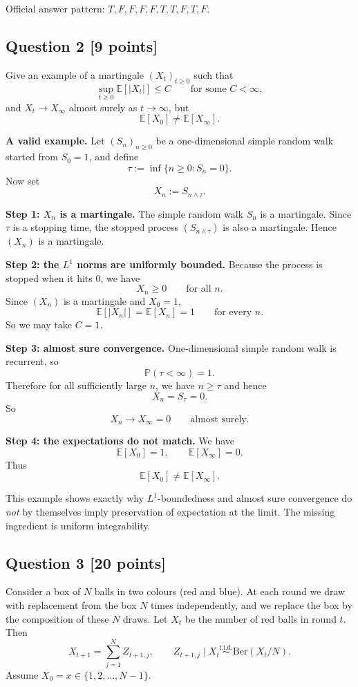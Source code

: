 \documentclass[11pt]{article}
\theoremstyle{definition}
\begin{document}
\begin{summarybox}
Official answer pattern: \(T,F,F,F,F,T,T,F,T,F\).
\end{summarybox}

\subsection*{Question 2 \hfill [9 points]}
Give an example of a martingale \((X_t)_{t\ge 0}\) such that
\[
\sup_{t\ge 0}\mathbb E[|X_t|]\le C
\qquad \text{for some } C<\infty,
\]
and \(X_t\to X_\infty\) almost surely as \(t\to\infty\), but
\[
\mathbb E[X_0]\neq \mathbb E[X_\infty].
\]

\textbf{A valid example.}
Let \((S_n)_{n\ge 0}\) be a one-dimensional simple random walk started from \(S_0=1\), and define
\[
\tau:=\inf\{n\ge 0:S_n=0\}.
\]
Now set
\[
X_n:=S_{n\wedge \tau}.
\]

\textbf{Step 1: \(X_n\) is a martingale.}
The simple random walk \(S_n\) is a martingale. Since \(\tau\) is a stopping time, the stopped process \((S_{n\wedge \tau})\) is also a martingale. Hence \((X_n)\) is a martingale.

\textbf{Step 2: the \(L^1\) norms are uniformly bounded.}
Because the process is stopped when it hits \(0\), we have
\[
X_n\ge 0
\qquad \text{for all } n.
\]
Since \((X_n)\) is a martingale and \(X_0=1\),
\[
\mathbb E[|X_n|]=\mathbb E[X_n]=1
\qquad \text{for every } n.
\]
So we may take \(C=1\).

\textbf{Step 3: almost sure convergence.}
One-dimensional simple random walk is recurrent, so
\[
\mathbb P(\tau<\infty)=1.
\]
Therefore for all sufficiently large \(n\), we have \(n\ge \tau\) and hence
\[
X_n=S_\tau=0.
\]
So
\[
X_n\to X_\infty=0
\qquad \text{almost surely.}
\]

\textbf{Step 4: the expectations do not match.}
We have
\[
\mathbb E[X_0]=1,
\qquad
\mathbb E[X_\infty]=0.
\]
Thus
\[
\mathbb E[X_0]\neq \mathbb E[X_\infty].
\]

\begin{summarybox}
This example shows exactly why \(L^1\)-boundedness and almost sure convergence do \emph{not} by themselves imply preservation of expectation at the limit. The missing ingredient is uniform integrability.
\end{summarybox}

\subsection*{Question 3 \hfill [20 points]}
Consider a box of \(N\) balls in two colours (red and blue). At each round we draw with replacement from the box \(N\) times independently, and we replace the box by the composition of these \(N\) draws. Let \(X_t\) be the number of red balls in round \(t\). Then
\[
X_{t+1}=\sum_{j=1}^N Z_{t+1,j},
\qquad
Z_{t+1,j}\mid X_t \overset{\text{i.i.d.}}{\sim} \mathrm{Ber}(X_t/N).
\]
Assume \(X_0=x\in\{1,2,\dots,N-1\}\).
\end{document}
